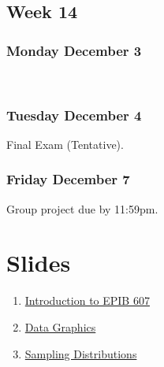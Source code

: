 \documentclass[]{book}
\providecommand{\tightlist}{%
  \setlength{\itemsep}{0pt}\setlength{\parskip}{0pt}}
\let\originaltabular\tabular
\let\endoriginaltabular\endtabular
\renewenvironment{tabular}[1]{%
  \begingroup%
  \centering%
  \originaltabular{#1}}%
  {\endoriginaltabular\endgroup}
\providecommand{\tightlist}{%
  \setlength{\itemsep}{0pt}\setlength{\parskip}{0pt}}
\theoremstyle{definition}
\theoremstyle{definition}
\theoremstyle{definition}
\theoremstyle{remark}
\begin{document}
\section{Week 14}\label{week-14}

\subsection{Monday December 3}\label{monday-december-3}

\begin{table}[H]
\centering
\begin{tabular}{l}
\hline
\\
\hline
\end{tabular}
\end{table}

\subsection{Tuesday December 4}\label{tuesday-december-4}

\begin{table}[H]
\centering
\begin{tabular}{l}
\hline
Final Exam (Tentative).\\
\hline
\end{tabular}
\end{table}

\subsection{Friday December 7}\label{friday-december-7}

\begin{table}[H]
\centering
\begin{tabular}{l}
\hline
Group project due by 11:59pm.\\
\hline
\end{tabular}
\end{table}

\chapter{Slides}\label{slides}

\begin{enumerate}
\def\labelenumi{\arabic{enumi}.}
\tightlist
\item
  \href{https://docs.google.com/presentation/d/15c0YIS2KJXFzTKgFfQ_xDjTAcvPyQb8JhSLGvsEHJ6o/edit?usp=sharing}{Introduction
  to EPIB 607}
\item
  \href{https://docs.google.com/presentation/d/1wXgcTzcRKl_leGRfNZjWWPkjwJSTlZSXBCl-fFuLEaE/edit?usp=sharing}{Data
  Graphics}
\item
  \href{https://github.com/sahirbhatnagar/EPIB607/raw/master/slides/sampling_dist/EPIB607_sampling_dist.pdf}{Sampling
  Distributions}
\end{enumerate}
\end{document}

